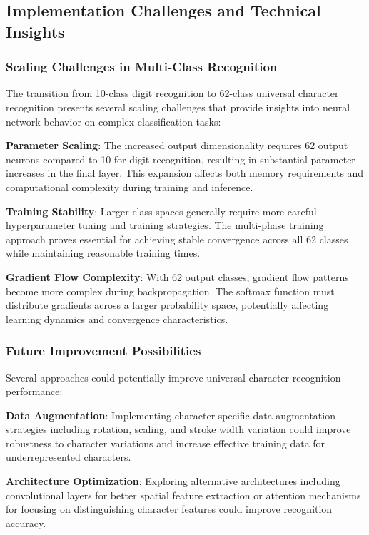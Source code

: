 \documentclass[11pt,a4paper]{report}
\begin{document}
\subsection{Implementation Challenges and Technical Insights}

\subsubsection{Scaling Challenges in Multi-Class Recognition}

The transition from 10-class digit recognition to 62-class universal character recognition presents several scaling challenges that provide insights into neural network behavior on complex classification tasks:

\textbf{Parameter Scaling}: The increased output dimensionality requires 62 output neurons compared to 10 for digit recognition, resulting in substantial parameter increases in the final layer. This expansion affects both memory requirements and computational complexity during training and inference.

\textbf{Training Stability}: Larger class spaces generally require more careful hyperparameter tuning and training strategies. The multi-phase training approach proves essential for achieving stable convergence across all 62 classes while maintaining reasonable training times.

\textbf{Gradient Flow Complexity}: With 62 output classes, gradient flow patterns become more complex during backpropagation. The softmax function must distribute gradients across a larger probability space, potentially affecting learning dynamics and convergence characteristics.

\subsubsection{Future Improvement Possibilities}

Several approaches could potentially improve universal character recognition performance:

\textbf{Data Augmentation}: Implementing character-specific data augmentation strategies including rotation, scaling, and stroke width variation could improve robustness to character variations and increase effective training data for underrepresented characters.

\textbf{Architecture Optimization}: Exploring alternative architectures including convolutional layers for better spatial feature extraction or attention mechanisms for focusing on distinguishing character features could improve recognition accuracy.
\end{document}
